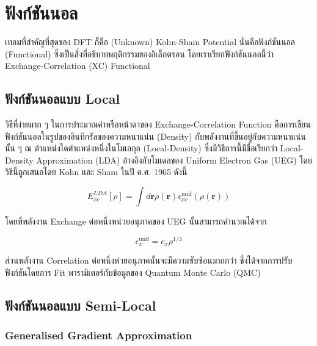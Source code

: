\section{ฟังก์ชันนอล}

เทอมที่สำคัญที่สุดของ DFT ก็คือ (Unknown) Kohn-Sham Potential นั่นคือฟังก์ชันนอล (Functional) ซึ่งเป็นสิ่งที่อธิบายพฤติกรรมของอิเล็กตรอน
โดยเราเรียกฟังก์ชันนอลนี้ว่า Exchange-Correlation (XC) Functional

\subsection{ฟังก์ชันนอลแบบ Local}

วิธีที่ง่ายมาก ๆ ในการประมาณค่าหรือหน้าตาของ Exchange-Correlation Function คือการเขียนฟังก์ชันนอลในรูปของอินทิกรัลของความหนาแน่น
(Density) กับพลังงานที่ขึ้นอยู่กับความหนาแน่นนั้น ๆ ณ ตำแหน่งใดตำแหน่งหนึ่งในโมเลกุล (Local-Density) ซึ่งมีวิธีการนี้มีชื่อเรียกว่า
Local-Density Approximation (LDA) อ้างอิงกับโมเดลของ Uniform Electron Gas (UEG) โดยวิธีนี้ถูกเสนอโดย Kohn และ Sham
ในปี ค.ศ. 1965 ดังนี้

\begin{equation}
  E_{xc}^{LDA}[\rho]
  =
  \int d \mathbf{r} \rho(\mathbf{r}) \epsilon_{x c}^{\mathrm{unif}}(\rho(\mathbf{r}))
\end{equation}

\noindent โดยที่พลังงาน Exchange ต่อหนึ่งหน่วยอนุภาคของ UEG นั้นสามารถคำนวณได้จาก

\begin{equation}
  \epsilon_x^{\mathrm{unif}}
  =
  c_x \rho^{1 / 3}
\end{equation}

\noindent ส่วนพลังงาน Correlation ต่อหนึ่งห่วยอนุภาคนั้นจะมีความซับซ้อนมากกว่า ซึ่งได้จากการปรับฟังก์ชันโดยการ Fit พารามิเตอร์กับข้อมูลของ
Quantum Monte Carlo (QMC)

\subsection{ฟังก์ชันนอลแบบ Semi-Local}

\subsubsection{Generalised Gradient Approximation}

